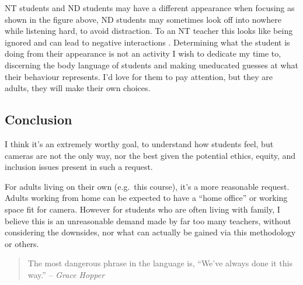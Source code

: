 \documentclass[paper=a4,justified,a4paper]{tufte-handout}
\begin{document}
NT students and ND students may have a different appearance when
focusing as shown in the figure above, ND students may sometimes look
off into nowhere while listening hard, to avoid distraction. To an NT
teacher this looks like being ignored and can lead to negative
interactions \citep{Clouder2020-ux}. Determining what the student is
doing from their appearance is not an activity I wish to dedicate my
time to, discerning the body language of students and making uneducated
guesses at what their behaviour represents. I'd love for them to pay
attention, but they are adults, they will make their own choices.

\hypertarget{conclusion}{%
\subsection{Conclusion}\label{conclusion}}

I think it's an extremely worthy goal, to understand how students feel,
but cameras are not the only way, nor the best given the potential
ethics, equity, and inclusion issues present in such a request.

For adults living on their own (e.g.~this course), it's a more
reasonable request. Adults working from home can be expected to have a
``home office'' or working space fit for camera. However for students
who are often living with family, I believe this is an unreasonable
demand made by far too many teachers, without considering the downsides,
nor what can actually be gained via this methodology or others.

\begin{quote}
The most dangerous phrase in the language is, ``We've always done it
this way.'' -- \emph{Grace Hopper}
\end{quote}


\end{document}
